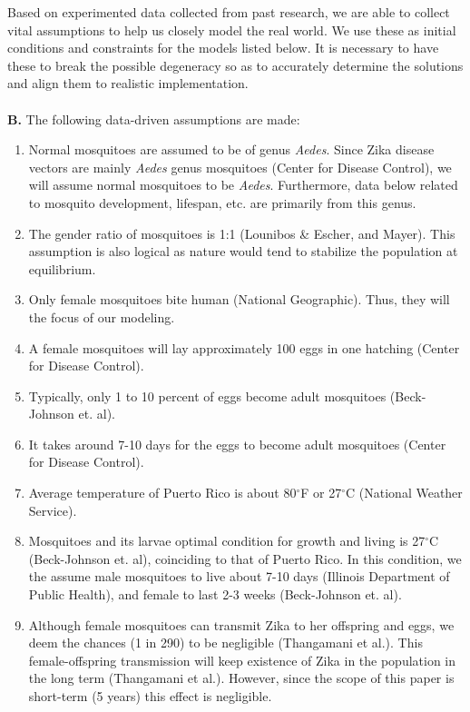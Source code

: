 \documentclass{article}
\begin{document}
Based on experimented data collected from past research, we are able to collect vital assumptions to help us closely model the real world. We use these as initial conditions and constraints for the models listed below. It is necessary to have these to break the possible degeneracy so as to accurately determine the solutions and align them to realistic implementation.\\ \\
\textbf{B.} The following data-driven assumptions are made: 
\begin{enumerate}
    \item Normal mosquitoes are assumed to be of genus \textit{Aedes}. Since Zika disease vectors are mainly \textit{Aedes} genus mosquitoes (Center for Disease Control), we will assume normal mosquitoes to be \textit{Aedes}. Furthermore, data below related to mosquito development, lifespan, etc. are primarily from this genus. 
    \item The gender ratio of mosquitoes is 1:1 (Lounibos \& Escher, and Mayer). This assumption is also logical as nature would tend to stabilize the population at equilibrium.
    \item Only female mosquitoes bite human (National Geographic). Thus, they will the focus of our modeling.
    \item A female mosquitoes will lay approximately 100 eggs in one hatching (Center for Disease Control).
    \item Typically, only 1 to 10 percent of eggs become adult mosquitoes (Beck-Johnson et. al).
    \item It takes around 7-10 days for the eggs to become adult mosquitoes (Center for Disease Control). 
    \item Average temperature of Puerto Rico is about 80$^{\circ}$F or 27$^{\circ}$C (National Weather Service).
    \item Mosquitoes and its larvae optimal condition for growth and living is 27$^{\circ}$C (Beck-Johnson et. al), coinciding to that of Puerto Rico. In this condition, we the assume male mosquitoes to live about 7-10 days (Illinois Department of Public Health), and female to last 2-3 weeks (Beck-Johnson et. al).
    \item Although female mosquitoes can transmit Zika to her offspring and eggs, we deem the chances (1 in 290) to be negligible (Thangamani et al.). This female-offspring transmission will keep existence of Zika in the population in the long term (Thangamani et al.). However, since the scope of this paper is short-term (5 years) this effect is negligible.

\end{enumerate}
\end{document}
